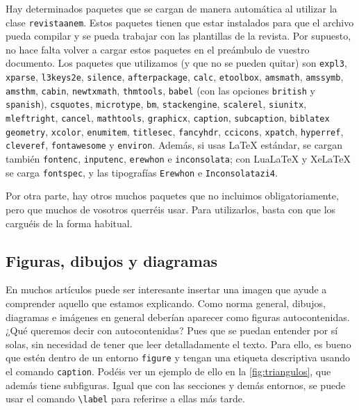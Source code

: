 \documentclass[bibtex, anon]{TEMat-article}
\begin{document}
Hay determinados paquetes que se cargan de manera automática al utilizar la clase \verb+revistaanem+.
Estos paquetes tienen que estar instalados para que el archivo pueda compilar y se pueda trabajar con las plantillas de la revista.
Por supuesto, no hace falta volver a cargar estos paquetes en el preámbulo de vuestro documento.
Los paquetes que utilizamos (y que no se pueden quitar) son \verb+expl3+, \verb+xparse+, \verb+l3keys2e+, \verb+silence+, \verb+afterpackage+, \verb+calc+, \verb+etoolbox+, \verb+amsmath+, \verb+amssymb+, \verb+amsthm+, \verb+cabin+, \verb+newtxmath+,  \verb+thmtools+, \verb+babel+ (con las opciones \verb+british+ y \verb+spanish+), \verb+csquotes+, \verb+microtype+, \verb+bm+, \verb+stackengine+, \verb+scalerel+, \verb+siunitx+, \verb+mleftright+, \verb+cancel+, \verb+mathtools+, \verb+graphicx+, \verb+caption+, \verb+subcaption+, \verb+biblatex+ \verb+geometry+, \verb+xcolor+, \verb+enumitem+, \verb+titlesec+, \verb+fancyhdr+, \verb+ccicons+, \verb+xpatch+, \verb+hyperref+, \verb+cleveref+, \verb+fontawesome+ y \verb+environ+.
Además, si usas LaTeX estándar, se cargan también \verb+fontenc+, \verb+inputenc+, \verb+erewhon+ e \verb+inconsolata+; con LuaLaTeX y XeLaTeX se carga \verb+fontspec+, y las tipografías \verb+Erewhon+ e \verb+Inconsolatazi4+.

Por otra parte, hay otros muchos paquetes que no incluimos obligatoriamente, pero que muchos de vosotros querréis usar.
Para utilizarlos, basta con que los carguéis de la forma habitual.

\subsection{Figuras, dibujos y diagramas}\label{sec:diagramas}
En muchos artículos puede ser interesante insertar una imagen que ayude a comprender aquello que estamos explicando.
Como norma general, dibujos, diagramas e imágenes en general deberían aparecer como figuras autocontenidas.
¿Qué queremos decir con autocontenidas?
Pues que se puedan entender por sí solas, sin necesidad de tener que leer detalladamente el texto.
Para ello, es bueno que estén dentro de un entorno \verb+figure+ y tengan una etiqueta descriptiva usando el comando \verb+caption+.
Podéis ver un ejemplo de ello en la \cref{fig:triangulos}, que además tiene subfiguras.
Igual que con las secciones y demás entornos, se puede usar el comando \verb+\label+ para referirse a ellas más tarde.
\end{document}
